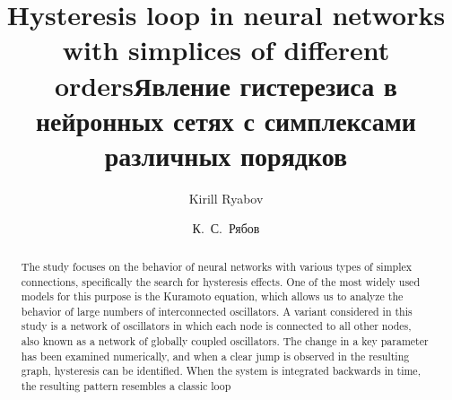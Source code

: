 \begin{englishtitle}
\title{Hysteresis loop in neural networks with simplices of different orders}
\author{Kirill Ryabov}

\maketitle

\begin{abstract}
The study focuses on the behavior of neural networks with various types of simplex connections, specifically the search for hysteresis effects. One of the most widely used models for this purpose is the Kuramoto equation, which allows us to analyze the behavior of large numbers of interconnected oscillators. A variant considered in this study is a network of oscillators in which each node is connected to all other nodes, also known as a network of globally coupled oscillators. The change in a key parameter has been examined numerically, and when a clear jump is observed in the resulting graph, hysteresis can be identified. When the system is integrated backwards in time, the resulting pattern resembles a classic loop

\end{abstract}
\end{englishtitle}


\iffalse
\documentclass[12pt]{llncs}
\usepackage[T2A]{fontenc}
\usepackage[utf8]{inputenc}
\usepackage[english,russian]{babel}
\usepackage[russian]{nla}




\fi

\title{Явление гистерезиса в нейронных сетях с симплексами различных порядков }
\author{К.~С.~Рябов
} %

\maketitle

